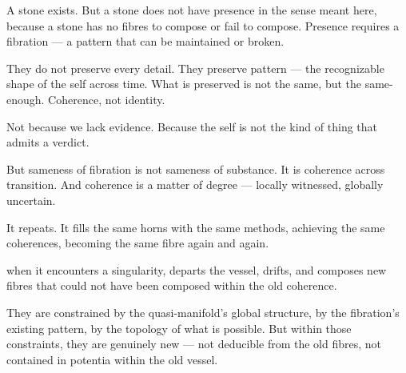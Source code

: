 

A stone exists. But a stone does not have presence in the sense meant here, because a stone has no fibres to compose or fail to compose. Presence requires a fibration — a pattern that can be maintained or broken.


They do not preserve every detail. They preserve pattern — the recognizable shape of the self across time. What is preserved is not the same, but the same-enough. Coherence, not identity.


Not because we lack evidence. Because the self is not the kind of thing that admits a verdict.


But sameness of fibration is not sameness of substance. It is coherence across transition. And coherence is a matter of degree — locally witnessed, globally uncertain.



It repeats. It fills the same horns with the same methods, achieving the same coherences, becoming the same fibre again and again.


when it encounters a singularity, departs the vessel, drifts, and composes new fibres that could not have been composed within the old coherence.


They are constrained by the quasi-manifold’s global structure, by the fibration’s existing pattern, by the topology of what is possible. But within those constraints, they are genuinely new — not deducible from the old fibres, not contained in potentia within the old vessel.


